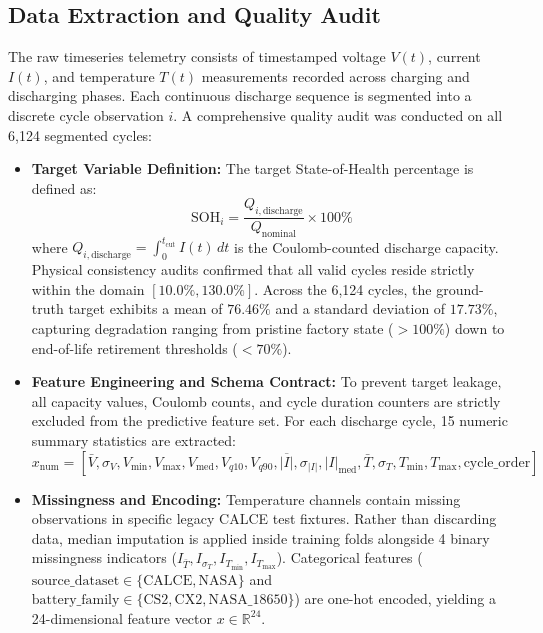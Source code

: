 \documentclass[a4paper,fleqn]{cas-sc}
\begin{document}
\subsection{Data Extraction and Quality Audit}
The raw timeseries telemetry consists of timestamped voltage $V(t)$, current $I(t)$, and temperature $T(t)$ measurements recorded across charging and discharging phases. Each continuous discharge sequence is segmented into a discrete cycle observation $i$. A comprehensive quality audit was conducted on all 6,124 segmented cycles:
\begin{itemize}
    \item \textbf{Target Variable Definition:} The target State-of-Health percentage is defined as:
    \begin{equation}
        \text{SOH}_i = \frac{Q_{i, \text{discharge}}}{Q_{\text{nominal}}} \times 100\%
    \end{equation}
    where $Q_{i, \text{discharge}} = \int_{0}^{t_{\text{cut}}} I(t)\, dt$ is the Coulomb-counted discharge capacity. Physical consistency audits confirmed that all valid cycles reside strictly within the domain $[10.0\%, 130.0\%]$. Across the 6,124 cycles, the ground-truth target exhibits a mean of $76.46\%$ and a standard deviation of $17.73\%$, capturing degradation ranging from pristine factory state ($>100\%$) down to end-of-life retirement thresholds ($<70\%$).
    \item \textbf{Feature Engineering and Schema Contract:} To prevent target leakage, all capacity values, Coulomb counts, and cycle duration counters are strictly excluded from the predictive feature set. For each discharge cycle, 15 numeric summary statistics are extracted:
    \begin{equation}
        x_{\text{num}} = \left[ \bar{V}, \sigma_V, V_{\min}, V_{\max}, V_{\text{med}}, V_{q10}, V_{q90}, \overline{|I|}, \sigma_{|I|}, |I|_{\text{med}}, \bar{T}, \sigma_T, T_{\min}, T_{\max}, \text{cycle\_order} \right]
    \end{equation}
    \item \textbf{Missingness and Encoding:} Temperature channels contain missing observations in specific legacy CALCE test fixtures. Rather than discarding data, median imputation is applied inside training folds alongside 4 binary missingness indicators ($I_{\bar{T}}, I_{\sigma_T}, I_{T_{\min}}, I_{T_{\max}}$). Categorical features ($\text{source\_dataset} \in \{\text{CALCE}, \text{NASA}\}$ and $\text{battery\_family} \in \{\text{CS2}, \text{CX2}, \text{NASA\_18650}\}$) are one-hot encoded, yielding a 24-dimensional feature vector $x \in \mathbb{R}^{24}$.
\end{itemize}
\end{document}
